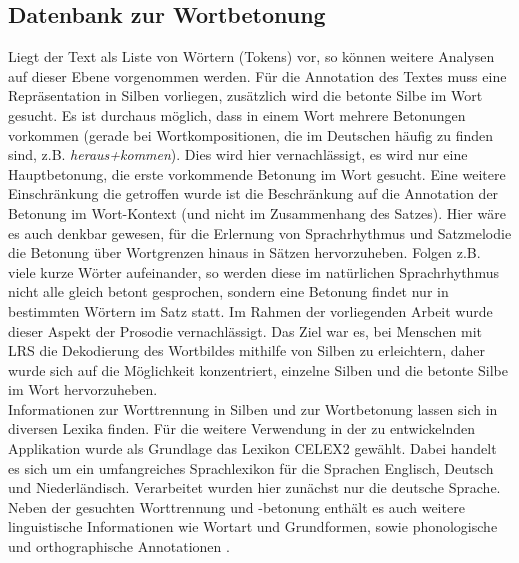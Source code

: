 \subsection{Datenbank zur Wortbetonung}
\label{sec:forschung-database}

Liegt der Text als Liste von Wörtern (Tokens) vor, so können weitere Analysen auf dieser Ebene vorgenommen werden. Für die Annotation des Textes muss eine Repräsentation in Silben vorliegen, zusätzlich wird die betonte Silbe im Wort gesucht. Es ist durchaus möglich, dass in einem Wort mehrere Betonungen vorkommen (gerade bei Wortkompositionen, die im Deutschen häufig zu finden sind, z.B. \textit{heraus+kommen}). Dies wird hier vernachlässigt, es wird nur eine Hauptbetonung, die erste vorkommende Betonung im Wort gesucht. Eine weitere Einschränkung die getroffen wurde ist die Beschränkung auf die Annotation der Betonung im Wort-Kontext (und nicht im Zusammenhang des Satzes). Hier wäre es auch denkbar gewesen, für die Erlernung von Sprachrhythmus und Satzmelodie die Betonung über Wortgrenzen hinaus in Sätzen hervorzuheben. Folgen z.B. viele kurze Wörter aufeinander, so werden diese im natürlichen Sprachrhythmus nicht alle gleich betont gesprochen, sondern eine Betonung findet nur in bestimmten Wörtern im Satz statt. Im Rahmen der vorliegenden Arbeit wurde dieser Aspekt der Prosodie vernachlässigt. Das Ziel war es, bei Menschen mit LRS die Dekodierung des Wortbildes mithilfe von Silben zu erleichtern, daher wurde sich auf die Möglichkeit konzentriert, einzelne Silben und die betonte Silbe im Wort hervorzuheben.\\

Informationen zur Worttrennung in Silben und zur Wortbetonung lassen sich in diversen Lexika finden.  Für die weitere Verwendung in der zu entwickelnden Applikation wurde als Grundlage das Lexikon CELEX2 gewählt. Dabei handelt es sich um ein umfangreiches Sprachlexikon für die Sprachen Englisch, Deutsch und Niederländisch. Verarbeitet wurden hier zunächst nur die deutsche Sprache. Neben der gesuchten Worttrennung und -betonung enthält es auch weitere linguistische Informationen wie Wortart und Grundformen, sowie phonologische und orthographische Annotationen \cite{Burnage1990}. 

